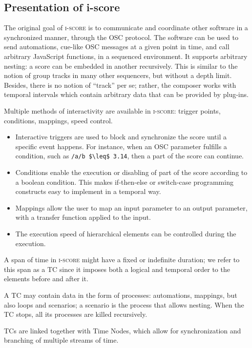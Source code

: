 \documentclass{article}
\newcommand*{\iscore}{\textsc{i-score}\xspace}
\newcommand*{\timeconstraint}{\ac{TC}\xspace}
\newcommand*{\timeconstraints}{\acp{TC}\xspace}
\begin{document}
\subsection{Presentation of i-score}
The original goal of \iscore is to communicate and coordinate other software in a synchronized manner, 
through the OSC protocol.
The software can be used to send automations, cue-like OSC messages at a given point in time, and call arbitrary JavaScript functions, in a sequenced environment.
It supports arbitrary nesting: a score can be embedded in another recursively.
This is similar to the notion of group tracks in many other sequencers, but without a depth limit. 
Besides, there is no notion of ``track'' per se; rather, the composer works with 
temporal intervals which contain arbitrary data that can be provided by plug-ins.

Multiple methods of interactivity are available in \iscore: trigger points, conditions, 
mappings, speed control.
\begin{itemize}
    \item Interactive triggers are used to block and synchronize the score until a specific event happens.
    For instance, when an OSC parameter fulfills a condition, such as  \lstinline[mathescape]!/a/b $\leq$ 3.14!, then 
    a part of the score can continue.
    \item Conditions enable the execution or disabling of part of the score according to a boolean condition.
    This makes if-then-else or switch-case programming constructs easy to implement in a temporal way.
    \item Mappings allow the user to map an input parameter to an output parameter, with a transfer function applied to the input.
    \item The execution speed of hierarchical elements can be controlled during the execution.
\end{itemize}

A span of time in \iscore might have a fixed or indefinite duration;
we refer to this span as a \timeconstraint since it imposes both a logical and temporal order to the elements before and after it.
 
A \timeconstraint may contain data in the form of processes: automations, mappings, but also loops and scenarios; a scenario is the process that allows nesting. 
When the \timeconstraint stops, all its processes are killed recursively.

\timeconstraints are linked together with Time Nodes, which allow for synchronization and branching of multiple streams of time.
\end{document}
